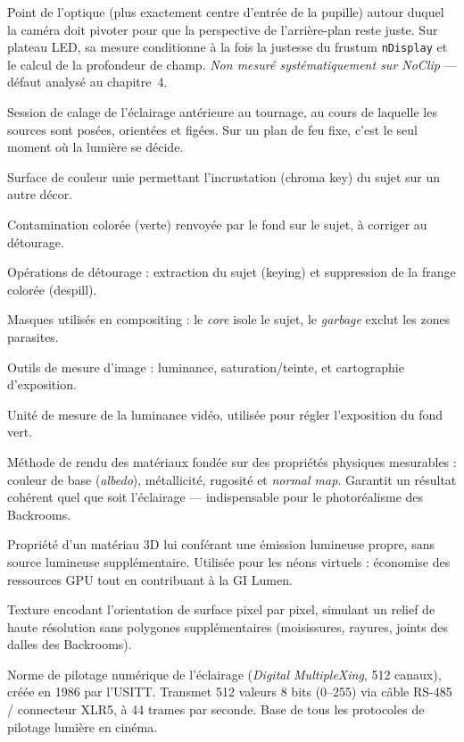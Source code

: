 \documentclass[11pt,a4paper]{report}
\begin{document}
\begin{description}[leftmargin=3.4cm,style=nextline,font=\bfseries\color{braccent}]
\item[Point nodal] Point de l'optique (plus exactement centre d'entrée de la pupille) autour duquel la caméra doit pivoter pour que la perspective de l'arrière-plan reste juste. Sur plateau LED, sa mesure conditionne à la fois la justesse du frustum \texttt{nDisplay} et le calcul de la profondeur de champ. \emph{Non mesuré systématiquement sur \textit{NoClip}} --- défaut analysé au chapitre~4.
\item[Pré-light] Session de calage de l'éclairage antérieure au tournage, au cours de laquelle les sources sont posées, orientées et figées. Sur un plan de feu fixe, c'est le seul moment où la lumière se décide.
\item[Fond vert / bleu] Surface de couleur unie permettant l'incrustation (chroma key) du sujet sur un autre décor.
\item[Spill] Contamination colorée (verte) renvoyée par le fond sur le sujet, à corriger au détourage.
\item[Keying / despill] Opérations de détourage : extraction du sujet (keying) et suppression de la frange colorée (despill).
\item[Core matte / garbage matte] Masques utilisés en compositing : le \emph{core} isole le sujet, le \emph{garbage} exclut les zones parasites.
\item[Waveform / vectorscope / false color] Outils de mesure d'image : luminance, saturation/teinte, et cartographie d'exposition.
\item[IRE] Unité de mesure de la luminance vidéo, utilisée pour régler l'exposition du fond vert.
\item[PBR (Physically Based Rendering)] Méthode de rendu des matériaux fondée sur des propriétés physiques mesurables : couleur de base (\emph{albedo}), métallicité, rugosité et \emph{normal map}. Garantit un résultat cohérent quel que soit l'éclairage --- indispensable pour le photoréalisme des Backrooms.
\item[Emissive (matériau UE5)] Propriété d'un matériau 3D lui conférant une émission lumineuse propre, sans source lumineuse supplémentaire. Utilisée pour les néons virtuels : économise des ressources GPU tout en contribuant à la GI Lumen.
\item[Normal map] Texture encodant l'orientation de surface pixel par pixel, simulant un relief de haute résolution sans polygones supplémentaires (moisissures, rayures, joints des dalles des Backrooms).
\item[DMX512] Norme de pilotage numérique de l'éclairage (\textit{Digital MultipleXing}, 512 canaux), créée en 1986 par l'USITT. Transmet 512 valeurs 8 bits (0--255) via câble RS-485 / connecteur XLR5, à 44 trames par seconde. Base de tous les protocoles de pilotage lumière en cinéma.

\end{description}
\end{document}
